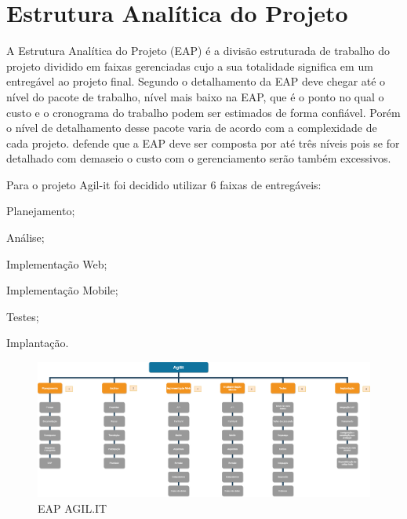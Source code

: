 \section{Estrutura Analítica do Projeto}
A Estrutura Analítica do Projeto (EAP) é a divisão estruturada de trabalho do projeto dividido em faixas gerenciadas cujo a sua totalidade significa em um entregável ao projeto final.
Segundo \cite{PMI2018} o detalhamento da EAP deve chegar até o nível do pacote de trabalho, nível mais baixo na EAP, que é o ponto no qual o custo e o cronograma do trabalho podem ser estimados de forma confiável. Porém o nível de detalhamento desse pacote varia de acordo com a complexidade de cada projeto. \cite{kerzner2017} defende que a EAP deve ser composta por até três níveis pois se for detalhado com demaseio o custo com o gerenciamento serão também excessivos.

Para o projeto Agil-it foi decidido utilizar 6 faixas de entregáveis:

\begin{subalineas}
	\item {Planejamento};
	\item {Análise};
	\item {Implementação Web};
	\item {Implementação Mobile};
	\item {Testes};
	\item {Implantação}.
\end{subalineas}

\newpage
\begin{landscape}
\begin{figure}[htb]
	\caption{\label{EAP}EAP AGIL.IT}
	\begin{center}
		\includegraphics[scale=0.38]{./Figuras/EAP.png}
	\end{center}
\end{figure}
\end{landscape}

